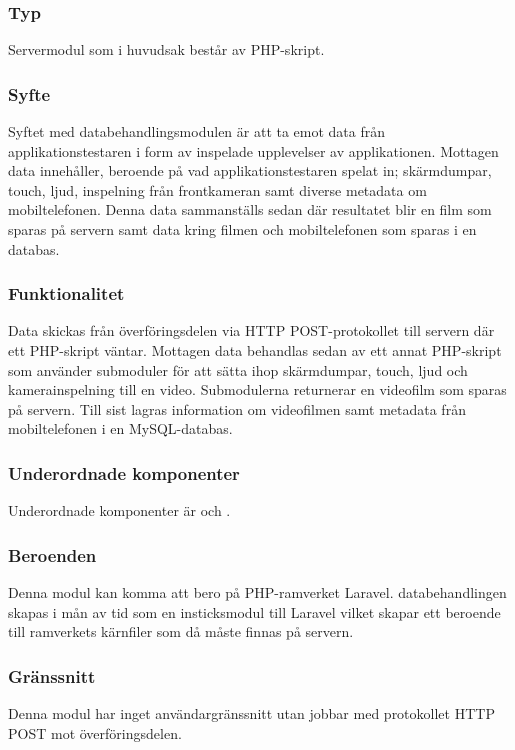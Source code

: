\subsubsection{Typ}
Servermodul som i huvudsak består av PHP-skript.

\subsubsection{Syfte}
Syftet med databehandlingsmodulen är att ta emot data från applikationstestaren i form av inspelade upplevelser av applikationen. Mottagen data innehåller, beroende på vad applikationstestaren spelat in; skärmdumpar, touch, ljud, inspelning från frontkameran samt diverse metadata om mobiltelefonen. Denna data sammanställs sedan där resultatet blir en film som sparas på servern samt data kring filmen och mobiltelefonen som sparas i en databas.

\subsubsection{Funktionalitet}
Data skickas från överföringsdelen via HTTP POST-protokollet till servern där ett PHP-skript väntar. Mottagen data behandlas sedan av ett annat PHP-skript som använder submoduler för att sätta ihop skärmdumpar, touch, ljud och kamerainspelning till en video. Submodulerna returnerar en videofilm som sparas på servern. Till sist lagras information om videofilmen samt metadata från mobiltelefonen i en MySQL-databas.

\subsubsection{Underordnade komponenter}
Underordnade komponenter är  och .

\subsubsection{Beroenden}
Denna modul kan komma att bero på PHP-ramverket Laravel. databehandlingen skapas i mån av tid som en insticksmodul till Laravel vilket skapar ett beroende till ramverkets kärnfiler som då måste finnas på servern.

\subsubsection{Gränssnitt}
Denna modul har inget användargränssnitt utan jobbar med protokollet HTTP POST mot överföringsdelen.


